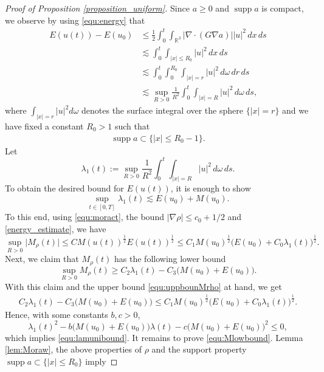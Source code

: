\documentclass[10pt%
]{amsart}
\numberwithin{equation}{section}
\newcommand{\R}{\mathbb{R}}
\theoremstyle{definition}
\def\supp{\mathop{\mathrm{supp}}\nolimits}
\begin{document}
\begin{proof}[Proof of Proposition \ref{proposition_uniform}]
	Since $a\ge0$ and $\mathop{\mathrm{supp}}a$ is compact, we observe by using \eqref{equ:energy} that
	\begin{align}\label{energy_estimate}
		E(u(t))-E(u_0)
		&\le \frac12\int_0^t\int_{\R^3}\big|\nabla\cdot(G\nabla a)\big||u|^2\,dx\,ds\\
		\nonumber
		&\lesssim \int_0^t\int_{|x|\le R_0}|u|^2\,dx\,ds\\
		\nonumber
		&\lesssim \int_0^t\int_0^{R_0} \int_{|x|=r}|u|^2\,d\omega\,dr\,ds\\
		\nonumber
		&\lesssim \sup_{R>0}\frac{1}{R^2}\int_0^t\int_{|x|=R}|u|^2\,d\omega\,ds,
	\end{align}
	where $\int_{|x|=r}|u|^2d\omega$ denotes the surface integral over the sphere $\{|x|=r\}$ and we have fixed a constant $R_0>1$ such that
	\begin{align}
		\label{supp_a}
		\supp a\subset \{|x|\le R_0-1\}.
	\end{align}
	Let
	$$
	\lambda_1(t):=\sup_{R>0}\frac{1}{R^2}\int_0^t\int_{|x|=R}|u|^2\,d\omega\,ds. 
	$$
	To obtain the desired bound for $E(u(t))$, it is enough to show 
	\begin{equation}\label{equ:lamunibound}
		\sup_{t\in [0,T]}\lambda_1(t)\lesssim E(u_0)+M(u_0).
	\end{equation}
	To this end, using \eqref{equ:moract}, the bound $|\nabla\rho|\le c_0+1/2$ and \eqref{energy_estimate}, we have
	\begin{equation}\label{equ:uppbounMrho}
		\sup_{R>0}\big|M_\rho(t)\big|\leq CM(u(t))^\frac12 E(u(t))^\frac12\leq C_1M(u_0)^\frac12\big(E(u_0)+C_0\lambda_1(t)\big)^\frac12. 
	\end{equation}
	Next, we claim that $M_\rho(t)$ has the following lower bound
	\begin{equation}\label{equ:Mlowbound}
		\sup_{R>0}M_\rho(t)\geq C_2\lambda_1(t)-C_3\big(M(u_0)+E(u_0)\big).
	\end{equation}
	With this claim and the upper bound \eqref{equ:uppbounMrho} at hand, we get
	\begin{align*}
		C_2\lambda_1(t)-C_3\big(M(u_0)+E(u_0)\big)\leq C_1M(u_0)^\frac12\big(E(u_0)+C_0\lambda_1(t)\big)^\frac12.
	\end{align*}
	Hence, with some constants $b,c>0$, 
	$$\lambda_1(t)^2-b\big(M(u_0)+E(u_0)\big)\lambda(t)-c \big(M(u_0)+E(u_0)\big)^2\leq 0,$$
	which implies \eqref{equ:lamunibound}. It remains to prove \eqref{equ:Mlowbound}. Lemma \ref{lem:Moraw}, the above properties of  $\rho$ and the support property $\supp a\subset \{|x|\le R_0\}$ imply

\end{proof}
\end{document}
